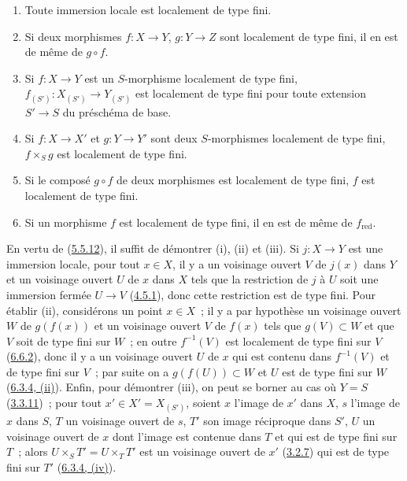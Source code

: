 \begin{proposition}[6.6.6]
\label{I.6.6.6-fr}
\begin{enumerate}
  \item[(i)] Toute immersion locale est localement de type fini.
  \item[(ii)] Si deux morphismes $f:X\to Y$, $g:Y\to Z$ sont localement de
    type fini, il en est de même de $g\circ f$.
  \item[(iii)] Si $f:X\to Y$ est un $S$-morphisme localement de type fini,
    $f_{(S')}:X_{(S')}\to Y_{(S')}$ est localement de type fini pour toute
    extension $S'\to S$ du préschéma de base.
  \item[(iv)] Si $f:X\to X'$ et $g:Y\to Y'$ sont deux $S$-morphismes
    localement de type fini, $f\times_S g$ est localement de type fini.
  \item[(v)] Si le composé $g\circ f$ de deux morphismes est localement de
    type fini, $f$ est localement de type fini.
  \item[(vi)] Si un morphisme $f$ est localement de type fini, il en est de
    même de $f_{\mathrm{red}}$.
\end{enumerate}
\end{proposition}

En vertu de (\hyperref[I.5.5.12-fr]{5.5.12}), il suffit de démontrer (i), (ii)
et (iii). Si $j:X\to Y$ est une immersion locale, pour tout $x\in X$, il y a
un voisinage ouvert $V$ de $j(x)$ dans $Y$ et un voisinage ouvert $U$ de $x$
dans $X$ tels que la restriction de $j$ à $U$ soit une immersion fermée
$U\to V$ (\hyperref[I.4.5.1-fr]{4.5.1}), donc cette restriction est de type
fini. Pour établir (ii), considérons un point $x\in X$~; il y a par hypothèse
un voisinage ouvert $W$ de $g(f(x))$ et un voisinage ouvert $V$ de $f(x)$
tels que $g(V)\subset W$ et que $V$ soit de type fini sur $W$~; en outre
$f^{-1}(V)$ est localement de type fini sur $V$
(\hyperref[I.6.6.2-fr]{6.6.2}), donc il y a un voisinage ouvert $U$ de $x$ qui
est contenu dans $f^{-1}(V)$ et de type fini sur $V$~; par suite on a
$g(f(U))\subset W$ et $U$ est de type fini sur $W$
(\hyperref[I.6.3.4-fr]{6.3.4, (ii)}). Enfin, pour démontrer (iii), on peut se
borner au cas où $Y=S$ (\hyperref[I.3.3.11-fr]{3.3.11})~; pour tout
$x'\in X'=X_{(S')}$, soient $x$ l'image de $x'$ dans $X$, $s$ l'image de $x$
dans $S$, $T$ un voisinage ouvert de $s$, $T'$ son image réciproque dans $S'$,
$U$ un voisinage ouvert de $x$ dont l'image est contenue dans $T$ et qui est de
type fini sur $T$~; alors $U\times_S T'=U\times_T T'$ est un voisinage ouvert
de $x'$ (\hyperref[I.3.2.7-fr]{3.2.7}) qui est de type fini sur $T'$
(\hyperref[I.6.3.4-fr]{6.3.4, (iv)}).

